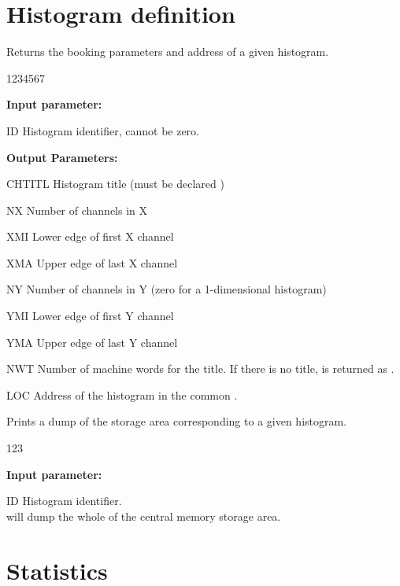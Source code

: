 \section{Histogram definition}
\label{HISTADDR}
 
 
\Action
Returns the booking parameters and address of a given histogram.
 
\begin{DLtt}{1234567}
\item[{\rm\bf Input parameter:}]
\item[ID] Histogram identifier, cannot be zero.
\item[{\rm\bf Output Parameters:}]
\item[CHTITL] Histogram title (must be declared )
\item[NX ] Number of channels in X
\item[XMI] Lower edge of first X channel
\item[XMA] Upper edge of last X channel
\item[NY] Number of channels in Y (zero for a 1-dimensional histogram)
\item[YMI] Lower edge of first Y channel
\item[YMA] Upper edge of last Y channel
\item[NWT] Number of machine words for the title.
If there is no title,  is returned as  .
\item[LOC] Address of the histogram in the common .
\end{DLtt}
 
 
\Action
Prints a dump of the  storage area corresponding to a given
histogram.
 
\begin{DLtt}{123}
\item[{\rm\bf Input parameter:}]
\item[ID] Histogram identifier.\\
 will dump the whole of the  central memory storage area.
\end{DLtt}
 
\newpage

\section{Statistics}
\label{HSTATIS2}
 
